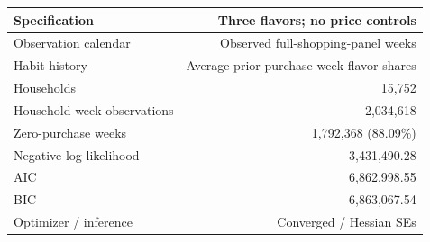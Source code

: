 \begin{tabular}{lr}\toprule
Specification & Three flavors; no price controls\\\midrule
Observation calendar & Observed full-shopping-panel weeks \\
Habit history & Average prior purchase-week flavor shares \\
Households & 15,752 \\
Household-week observations & 2,034,618 \\
Zero-purchase weeks & 1,792,368 (88.09\%) \\
Negative log likelihood & 3,431,490.28 \\
AIC & 6,862,998.55 \\
BIC & 6,863,067.54 \\
Optimizer / inference & Converged / Hessian SEs \\
\bottomrule\end{tabular}
